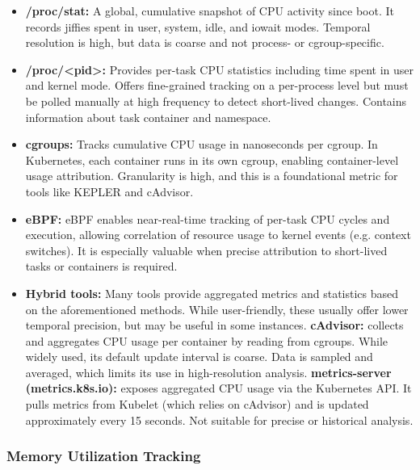 \begin{itemize}
    \item \textbf{/proc/stat:} A global, cumulative snapshot of CPU activity since boot. It records jiffies spent in user, system, idle, and iowait modes. Temporal resolution is high, but data is coarse and not process- or cgroup-specific.
    \item \textbf{/proc/\textless pid\textgreater :} Provides per-task CPU statistics including time spent in user and kernel mode. Offers fine-grained tracking on a per-process level but must be polled manually at high frequency to detect short-lived changes. Contains information about task container and namespace.
    \item \textbf{cgroups:} Tracks cumulative CPU usage in nanoseconds per cgroup. In Kubernetes, each container runs in its own cgroup, enabling container-level usage attribution. Granularity is high, and this is a foundational metric for tools like KEPLER and cAdvisor.
    \item \textbf{eBPF:} eBPF enables near-real-time tracking of per-task CPU cycles and execution, allowing correlation of resource usage to kernel events (e.g. context switches). It is especially valuable when precise attribution to short-lived tasks or containers is required.
    \item \textbf{Hybrid tools:} Many tools provide aggregated metrics and statistics based on the aforementioned methods. While user-friendly, these usually offer lower temporal precision, but may be useful in some instances. \textbf{cAdvisor:} collects and aggregates CPU usage per container by reading from cgroups. While widely used, its default update interval is coarse. Data is sampled and averaged, which limits its use in high-resolution analysis. \textbf{metrics-server (metrics.k8s.io):} exposes aggregated CPU usage via the Kubernetes API. It pulls metrics from Kubelet (which relies on cAdvisor) and is updated approximately every 15 seconds. Not suitable for precise or historical analysis.
\end{itemize}

\subsubsection{Memory Utilization Tracking}


